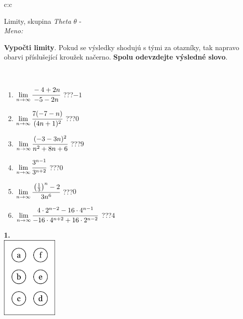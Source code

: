 \documentclass[10pt]{report}
\begin{document}
\begin{tabular}{c:c}
\begin{minipage}[c][104.5mm][t]{0.5\linewidth}
\begin{center}
\vspace{7mm}
{\huge Limity, skupina \textit{Theta $\theta$} -}\\[5mm]
\textit{Meno:}\phantom{xxxxxxxxxxxxxxxxxxxxxxxxxxxxxxxxxxxxxxxxxxxxxxxxxxxxxxxxxxxxxxxxx}\\[5mm]
\begin{minipage}{0.95\linewidth}
\begin{center}
\textbf{Vypočti limity}. Pokud se výsledky shodujú s tými za otazníky, tak napravo\\obarvi příslušející kroužek načerno. \textbf{Spolu odevzdejte výsledné slovo}.
\end{center}
\end{minipage}
\\[1mm]
\begin{minipage}{0.79\linewidth}
\begin{center}
\begin{varwidth}{\linewidth}
\begin{enumerate}
\normalsize
\item $\lim\limits_{n\to\infty}\cfrac{-4+2n}{-5-2n}$\quad \dotfill\; ???\;\dotfill \quad $-1$
\item $\lim\limits_{n\to\infty}\cfrac{7(-7-n)}{(4n+1)^2}$\quad \dotfill\; ???\;\dotfill \quad $0$
\item $\lim\limits_{n\to\infty}\cfrac{(-3-3n)^2}{n^2+8n+6}$\quad \dotfill\; ???\;\dotfill \quad $9$
\item $\lim\limits_{n\to\infty}\cfrac{3^{n-1}}{3^{n+2}}$\quad \dotfill\; ???\;\dotfill \quad $0$
\item $\lim\limits_{n\to\infty}\cfrac{\left(\frac{1}{3}\right)^n -2}{3n^{6}}$\quad \dotfill\; ???\;\dotfill \quad $0$
\item $\lim\limits_{n\to\infty}\cfrac{4\cdot 2^{n-2}-16\cdot 4^{n-1}}{-16\cdot 4^{n+2}+16\cdot 2^{n-2}}$\quad \dotfill\; ???\;\dotfill \quad $4$
\end{enumerate}
\end{varwidth}
\end{center}
\end{minipage}
\begin{minipage}{0.20\linewidth}
\begin{center}
{\Huge\bfseries 1.} \\[2mm]
\includegraphics[height=40mm]{../images/braille.png}

\end{center}
\end{minipage}
\end{center}
\end{minipage}
\end{tabular}
\end{document}
